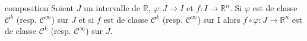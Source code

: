 \documentclass[a4paper,10pt]{report}
\begin{document}
%


\begin{Proposition}{composition} Soient $J$ un intervalle de $\mathbb{R}$, $\varphi : J \rightarrow I$ et $f : I \rightarrow \mathbb{R}^n$. Si $\varphi$ est de classe $\mathcal{C}^k$ (resp. $\mathcal{C}^{\infty}$) sur $J$ et si $f$ est de classe $\mathcal{C}^k$ (resp. $\mathcal{C}^{\infty}$) sur I alors $f \circ \varphi : J \rightarrow \mathbb{R}^n$ est de classe $\mathcal{C}^k$ (resp. $\mathcal{C}^{\infty}$) sur $J$. 
\end{Proposition}
\end{document}
